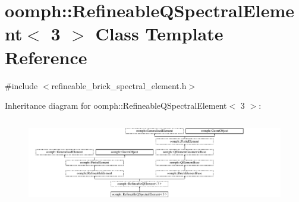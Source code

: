 \hypertarget{classoomph_1_1RefineableQSpectralElement_3_013_01_4}{}\section{oomph\+:\+:Refineable\+Q\+Spectral\+Element$<$ 3 $>$ Class Template Reference}
\label{classoomph_1_1RefineableQSpectralElement_3_013_01_4}


{\ttfamily \#include $<$refineable\+\_\+brick\+\_\+spectral\+\_\+element.\+h$>$}

Inheritance diagram for oomph\+:\+:Refineable\+Q\+Spectral\+Element$<$ 3 $>$\+:\begin{figure}[H]
\begin{center}
\leavevmode
\includegraphics[height=3.843138cm]{classoomph_1_1RefineableQSpectralElement_3_013_01_4}
\end{center}
\end{figure}
